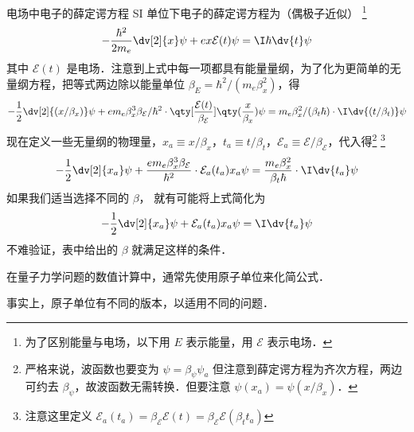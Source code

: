 
\begin{exam}{电场中电子的薛定谔方程} %
SI 单位下电子的薛定谔方程为（偶极子近似） \footnote{为了区别能量与电场，以下用 $E$ 表示能量，用 $\mathcal{E}$ 表示电场．} 
\begin{equation}
-\frac{\hbar^2}{2m_e} \dv[2]{x} \psi + e x\mathcal{E}(t)\psi= \I\hbar \dv{t} \psi
\end{equation}
其中 $\mathcal{E}(t)$ 是电场．注意到上式中每一项都具有能量量纲，为了化为更简单的无量纲方程，把等式两边除以能量单位 $\beta_E= \hbar^2/(m_e\beta_x^2)$，得
\begin{equation}\label{AU_eq3}
-\frac12 \dv[2]{(x/\beta_x)} \psi + e m_e\beta_x^3\beta_\mathcal{E}/\hbar^2 \cdot \qty[\frac{\mathcal{E}(t)}{\beta_\mathcal{E}}] \qty(\frac{x}{\beta_x})\psi= m_e\beta_x^2/(\beta_t\hbar)\cdot\I \dv{(t/\beta_t)}\psi
\end{equation}
现在定义一些无量纲的物理量，$x_a \equiv x/\beta_x$，$t_a \equiv t/\beta_t$，$\mathcal{E}_a \equiv \mathcal{E}/\beta_\mathcal{E}$，代入得\footnote{严格来说，波函数也要变为 $\psi=\beta_\psi\psi_a$ 但注意到薛定谔方程为齐次方程，两边可约去 $\beta_\psi$，故波函数无需转换．但要注意 $\psi(x_a) = \psi(x/\beta_x)$．} \footnote{注意这里定义 $\mathcal{E}_a(t_a)=\beta_\mathcal{E}\mathcal{E}(t)=\beta_\mathcal{E}\mathcal{E}(\beta_t t_a)$}
\begin{equation}\label{AU_eq2}
-\frac12 \dv[2]{x_a} \psi + \frac{e m_e\beta_x^3\beta_\mathcal{E}}{\hbar^2}\cdot \mathcal{E}_a(t_a) x_a\psi= \frac{m_e\beta_x^2}{\beta_t\hbar}\cdot\I \dv{t_a}\psi
\end{equation}
如果我们适当选择不同的 $\beta$， 就有可能将上式简化为
\begin{equation}\label{AU_eq1}
-\frac12 \dv[2]{x_a}\psi +\mathcal{E}_a(t_a) x_a\psi= \I \dv{t_a}\psi
\end{equation}
不难验证，表中给出的 $\beta$ 就满足这样的条件．

在量子力学问题的数值计算中，通常先使用原子单位来化简公式．
\end{exam}

事实上，原子单位有不同的版本，以适用不同的问题．

